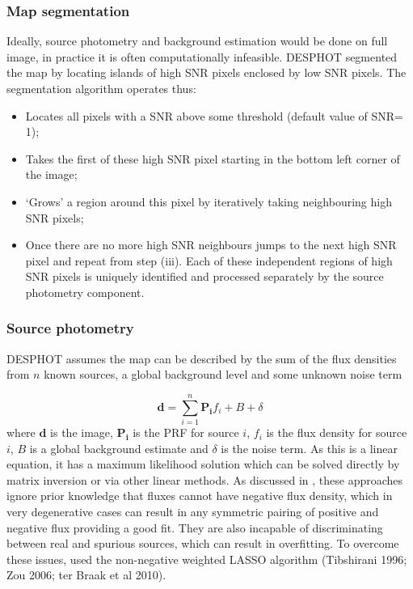 \documentclass[useAMS,usenatbib]{mn2e}
\begin{document}
\subsubsection{Map segmentation}
Ideally, source photometry and background estimation would be done on full image, in practice it is often computationally infeasible. DESPHOT segmented the map by locating islands of high SNR pixels enclosed by low SNR pixels. The segmentation algorithm operates thus:
\begin{itemize}
\item Locates all pixels with a SNR above some threshold (default value of SNR= 1);
\item Takes the first of these high SNR pixel starting in the bottom left corner of the image;
\item `Grows' a region around this pixel by iteratively taking neighbouring high SNR pixels;
\item Once there are no more high SNR neighbours jumps to the next high SNR pixel and repeat from step (iii).
Each of these independent regions of high SNR pixels is uniquely identified and processed separately by the source photometry component.
\end{itemize}
\subsubsection{Source photometry}
DESPHOT assumes the map can be described by the sum of the flux densities from $n$ known sources, a global background level and some unknown noise term

\begin{equation}
\mathbf{d} = \sum\limits_{i=1}^n \mathbf{P_i}f_i + B + \delta
\end{equation}
where $\mathbf{d}$ is the image, $\mathbf{P_i}$ is the PRF for source $i$, $f_i$ is the flux density for source $i$, $B$ is a global background estimate and $\delta$ is the noise term. As this is a linear equation, it has a maximum likelihood solution which can be solved directly by matrix inversion or via other linear methods. As discussed in \cite{Roseboom:2010, Roseboom:2011, Wang:2014}, these approaches ignore prior knowledge that fluxes cannot have negative flux density, which in very degenerative cases can result in any symmetric pairing of positive and negative flux providing a good fit. They are also incapable of discriminating between real and spurious sources, which can result in overfitting. To overcome these issues, \cite{Roseboom:2011} used the non-negative weighted LASSO algorithm (Tibshirani 1996; Zou 2006; ter Braak et al 2010).
\end{document}
